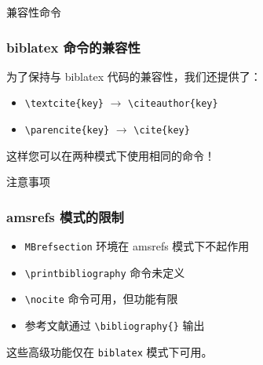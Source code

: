 \documentclass[authoryear,zh]{ustcmb}
\begin{document}
\begin{frame}{兼容性命令}
  \frametitle{biblatex 命令的兼容性}
  
  为了保持与 biblatex 代码的兼容性，我们还提供了：
  
  \begin{itemize}
    \item \texttt{\textbackslash textcite\{key\}} $\rightarrow$ \texttt{\textbackslash citeauthor\{key\}}
    \item \texttt{\textbackslash parencite\{key\}} $\rightarrow$ \texttt{\textbackslash cite\{key\}}
  \end{itemize}
  
  这样您可以在两种模式下使用相同的命令！
\end{frame}

\begin{frame}{注意事项}
  \frametitle{amsrefs 模式的限制}
  
  \begin{itemize}
    \item \texttt{MBrefsection} 环境在 amsrefs 模式下不起作用
    \item \texttt{\textbackslash printbibliography} 命令未定义
    \item \texttt{\textbackslash nocite} 命令可用，但功能有限
    \item 参考文献通过 \texttt{\textbackslash bibliography\{\jobname\}} 输出
  \end{itemize}
  
  这些高级功能仅在 \texttt{biblatex} 模式下可用。
\end{frame}

\end{document}
